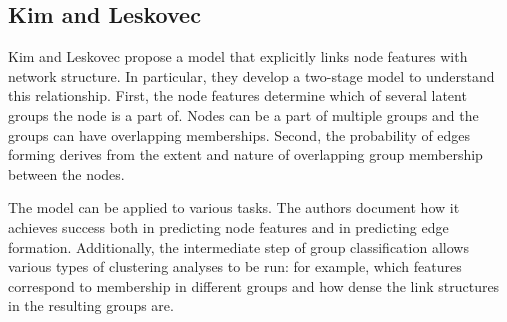 \subsection{Kim and Leskovec}

Kim and Leskovec propose a model that explicitly links node features with network structure. In particular, they develop a two-stage model to understand this relationship. First, the node features determine which of several latent groups the node is a part of. Nodes can be a part of multiple groups and the groups can have overlapping memberships. Second, the probability of edges forming derives from the extent and nature of overlapping group membership between the nodes.

The model can be applied to various tasks. The authors document how it achieves success both in predicting node features and in predicting edge formation. Additionally, the intermediate step of group classification allows various types of clustering analyses to be run: for example, which features correspond to membership in different groups and how dense the link structures in the resulting groups are.

